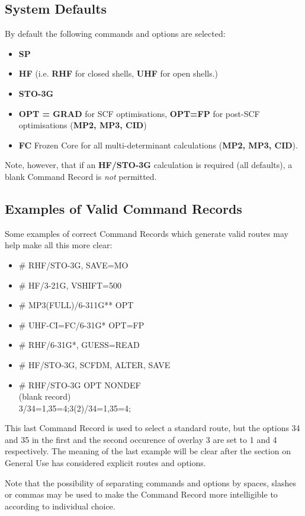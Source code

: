 \subsection{\sf System Defaults}
By default the following commands and options are selected:
\begin{itemize}
\item {\bf SP}
\item {\bf HF}  (i.e. {\bf RHF} for closed shells, {\bf UHF} for open shells.)
\item {\bf STO-3G}
\item {\bf OPT = GRAD} for SCF optimisations, {\bf OPT=FP} for
post-SCF optimisations ({\bf MP2, MP3, CID})
\item {\bf FC} Frozen Core for all multi-determinant calculations
({\bf MP2, MP3, CID}).
\end{itemize}
Note, however, that if an {\bf HF/STO-3G} calculation is required
(all defaults), a blank
Command Record is {\em not} permitted.
\subsection{\sf Examples of Valid Command Records}
Some examples of correct Command Records which
generate valid routes may help make all this
more clear:
\begin{itemize}
\item \#  RHF/STO-3G, SAVE=MO
\item \#  HF/3-21G, VSHIFT=500
\item \#  MP3(FULL)/6-311G** OPT
\item \#  UHF-CI=FC/6-31G* OPT=FP
\item \#  RHF/6-31G*, GUESS=READ
\item \#  HF/STO-3G, SCFDM, ALTER, SAVE
\item \#  RHF/STO-3G OPT NONDEF \\
(blank record) \\
3/34=1,35=4;3(2)/34=1,35=4;
\end{itemize}
This last Command Record is used to select a standard route, 
but the options 34
and 35 in the first and the second occurence of overlay 3 are set to 1
and 4 respectively. The meaning of the last example will be 
clear after the section on General Use has considered explicit
routes and options.

Note that the possibility of separating commands and options by
spaces, slashes or commas may be used to make the Command Record
more intelligible to according to individual choice.

